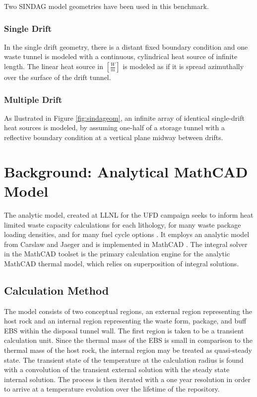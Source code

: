 \documentclass{anstrans}
\begin{document}
Two \gls{SINDAG} model geometries have been used in this benchmark.  

\subsubsection{Single Drift}

In the single drift geometry, there is a distant fixed boundary condition and 
one waste tunnel is modeled with a continuous, cylindrical heat source of 
infinite length. The linear heat source in $[\frac{W}{m}]$ is modeled as if it 
is spread azimuthally over the surface of the drift tunnel. 

\subsubsection{Multiple Drift}

As llustrated in Figure \ref{fig:sindageom}, an infinite array of identical single-drift heat sources is modeled,
by assuming one-half of a storage tunnel with a reflective boundary condition at a vertical
plane midway between drifts. 

\section{Background: Analytical MathCAD Model}

The analytic model, created at \gls{LLNL} for the \gls{UFD} campaign seeks to 
inform heat limited waste capacity calculations for each lithology, for many 
waste package loading densities, and for many fuel cycle options 
\cite{hardin_generic_2011, sutton_investigations_2011, 
greenberg_application_2012}. It employs an analytic model from Carslaw and 
Jaeger and is implemented in MathCAD \cite{carslaw_conduction_1959, 
ptc_mathcad_2010}.  The integral solver in the MathCAD toolset is the primary 
calculation engine for the analytic MathCAD thermal model, which relies on 
superposition of integral solutions.  

\subsection{Calculation Method}

The model consists of two conceptual regions, an external region representing 
the host rock and an internal region representing the waste form, package, and 
buff \gls{EBS} within the disposal tunnel wall. The first region is taken to be  
a transient calculation unit.  Since the thermal mass of the \gls{EBS} is small 
in comparison to the thermal mass of the host rock, the internal region may be 
treated as quasi-steady state. The transient state of the temperature at the 
calculation radius is found with a convolution of the transient external 
solution with the steady state internal solution.  The process is then iterated 
with a one year resolution in order to arrive at a temperature evolution over 
the lifetime of the repository. 
\end{document}
